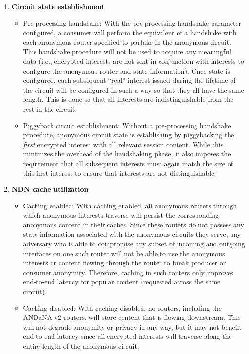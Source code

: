 \documentclass[10pt]{article}
\begin{document}
\begin{enumerate}
\item \textbf{Circuit state establishment}
\begin{itemize}
  \item Pre-processing handshake: With the pre-processing handshake parameter configured, a consumer will perform the equivalent of a handshake with each anonymous router specified to partake in the anonymous circuit. This handshake procedure will not be used to acquire any meaningful data (i.e., encrypted interests are not sent in conjunction with interests to configure the anonymous router and state information). Once state is configured, each subsequent ``real'' interest issued during the lifetime of the circuit will be configured in such a way so that they all have the same length. This is done so that all interests are indistinguishable from the rest in the circuit.

  \item Piggyback circuit establishment: Without a pre-processing handshake procedure, anonymous circuit state is establishing by piggybacking the \emph{first} encrypted interest with all relevant session content. While this minimizes the overhead of the handshaking phase, it also imposes the requirement that all subsequent interests must again match the size of this first interest to ensure that interests are not distinguishable. 
\end{itemize}

\item \textbf{NDN cache utilization}
\begin{itemize}
  \item Caching enabled: With caching enabled, all anonymous routers through which anonymous interests traverse will persist the corresponding anonymous content in their caches. Since these routers do not possess any state information associated with the anonymous circuits they serve, any adversary who is able to compromise any subset of incoming and outgoing interfaces on one such router will not be able to use the anonymous interests or content flowing through the router to break producer or consumer anonymity. Therefore, caching in such routers only improves end-to-end latency for popular content (requested across the same circuit).

  \item Caching disabled: With caching disabled, no routers, including the {\sf AND\=aNA-v2} routers, will store content that is flowing downstream. This will not degrade anonymity or privacy in any way, but it may not benefit end-to-end latency since all encrypted interests will traverse along the entire length of the anonymous circuit. 
\end{itemize}


\end{enumerate}
\end{document}
